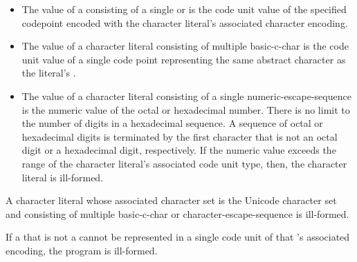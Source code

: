 \documentclass{wg21}
\begin{document}
\begin{addedblock}
\begin{itemize}
\item The value of a   consisting of a single   or   is the code unit value of the specified codepoint encoded with the character literal's associated character encoding.

\item The value of a character literal consisting of multiple basic-c-char is the code unit value of a single code point representing the same abstract character as the literal's . 

\item The value of a character literal consisting of a single numeric-escape-sequence is the numeric value of the octal or hexadecimal number. There is no limit to the number of digits in a hexadecimal sequence. A sequence of octal or hexadecimal digits is terminated by the first character that is not an octal digit or a hexadecimal digit, respectively. If the numeric value exceeds the range of the character literal's associated code unit type, then, the character literal is ill-formed.
  
\end{itemize}

A character literal whose associated character set is the Unicode character set and consisting of multiple basic-c-char or character-escape-sequence is ill-formed.

If a  that is not a  cannot be represented in a single code unit of that 's associated encoding, the program is ill-formed.


\end{addedblock}
\end{document}
